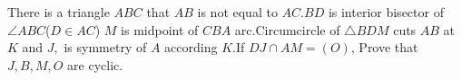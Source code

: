 There is a triangle $ABC$ that $AB$ is not equal to $AC$.$BD$ is interior bisector of $\angle{ABC}$($D\in AC$) $M$ is midpoint of $CBA$ arc.Circumcircle of $\triangle{BDM}$ cuts $AB$ at $K$ and $J,$ is symmetry of $A$ according $K$.If $DJ\cap AM=(O)$,  Prove that $J,B,M,O$ are cyclic.